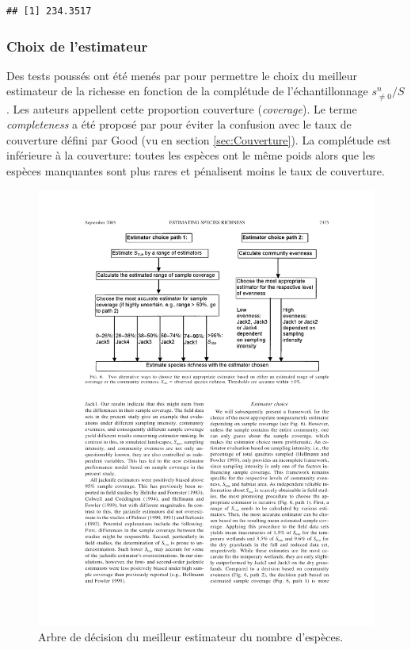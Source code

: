 \documentclass[
  11pt,
  french,
  a4paper,
  extrafontsizes,onecolumn,openright
  ]{memoir}
\begin{document}
\begin{verbatim}
## [1] 234.3517
\end{verbatim}

\normalsize

\hypertarget{sec:ChoixEstimateur}{%
\subsubsection{Choix de l'estimateur}\label{sec:ChoixEstimateur}}

Des tests poussés ont été menés par \textcite{Brose2003} pour permettre le choix du meilleur estimateur de la richesse en fonction de la complétude de l'échantillonnage \(s^{n}_{\ne 0}/{S}\).
Les auteurs appellent cette proportion couverture (\emph{coverage}).
Le terme \emph{completeness} a été proposé par \textcite{Beck2010} pour éviter la confusion avec le taux de couverture défini par Good (vu en section \ref{sec:Couverture}).
La complétude est inférieure à la couverture: toutes les espèces ont le même poids alors que les espèces manquantes sont plus rares et pénalisent moins le taux de couverture.



\scriptsize

\begin{figure}

{\centering \includegraphics[width=0.8\linewidth]{images/Brose2003} 

}

\caption{Arbre de décision du meilleur estimateur du nombre d'espèces.}\label{fig:Brose2003}
\end{figure}
\end{document}
